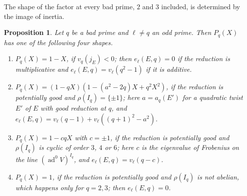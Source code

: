 \documentclass[11pt]{amsart}
\newtheorem{proposition}[theorem]{Proposition}
\theoremstyle{definition}
\newcommand{\ad}{\operatorname{ad}^0}
\begin{document}
The shape of the factor at every bad prime, $2$ and $3$ included, is determined by the image of inertia.

\begin{proposition}\label{prop:shapes}
Let $q$ be a bad prime and $\ell\ne q$ an odd prime. Then $P_q(X)$ has one of the following four shapes.
\begin{enumerate}
\item[(i)] $P_q(X)=1-X$, if $v_q(j_E)<0$; then $e_\ell(E,q)=0$ if the reduction is multiplicative and $e_\ell(E,q)=v_\ell(q^2-1)$ if it is additive.
\item[(ii)] $P_q(X)=(1-qX)(1-(a^2-2q)X+q^2X^2)$, if the reduction is potentially good and $\rho(I_q)=\{\pm1\}$; here $a=a_q(E')$ for a quadratic twist $E'$ of $E$ with good reduction at $q$, and $e_\ell(E,q)=v_\ell(q-1)+v_\ell((q+1)^2-a^2)$.
\item[(iii)] $P_q(X)=1-cqX$ with $c=\pm1$, if the reduction is potentially good and $\rho(I_q)$ is cyclic of order $3$, $4$ or $6$; here $c$ is the eigenvalue of Frobenius on the line $(\ad V)^{I_q}$, and $e_\ell(E,q)=v_\ell(q-c)$.
\item[(iv)] $P_q(X)=1$, if the reduction is potentially good and $\rho(I_q)$ is not abelian, which happens only for $q=2,3$; then $e_\ell(E,q)=0$.
\end{enumerate}
\end{proposition}
\end{document}
